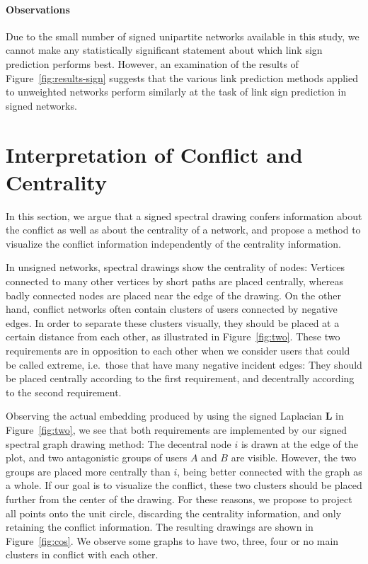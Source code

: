 \documentclass[11pt,a4paper]{book}
\begin{document}
\paragraph{Observations}
Due to the small number of signed unipartite networks available in this
study, we cannot make any statistically significant statement about
which link sign prediction performs best.  However, an examination of
the results of Figure~\ref{fig:results-sign} suggests that the various link
prediction methods applied to unweighted networks perform similarly at
the task of link sign prediction in signed networks. 

\section{Interpretation of Conflict and Centrality}
\label{sec:interpretation}
In this section, we argue that a signed spectral drawing confers
information about the conflict as well as about the centrality of a
network, and propose a method
to visualize the conflict information independently of the centrality
information. 

In unsigned networks, spectral drawings show the centrality of nodes:
Vertices connected to many other vertices by short paths are placed
centrally, whereas badly connected nodes are placed near the edge of the
drawing.    
On the other hand, conflict networks often contain clusters of
users connected by negative edges. 
In order to separate these clusters visually, they should be placed at a
certain distance from each other, as illustrated in Figure~\ref{fig:two}. 
These two requirements are in opposition to each other when we consider
users that could be called extreme, i.e.\ those that have many
negative incident edges:  They should be placed centrally according to
the first requirement, and decentrally according to the second
requirement.  

Observing the actual embedding produced by using the signed Laplacian
$\mathbf L$
in Figure~\ref{fig:two}, we see that both requirements are
implemented by our signed spectral graph drawing method:  The decentral
node $i$ is drawn at the edge of the plot, and two antagonistic
groups of users $A$ and $B$ are visible.  However, the two groups are
placed more centrally than $i$, being better connected with the graph
as a whole.  If our goal is to visualize the conflict, these two
clusters should be placed further from the center of the drawing.  For
these reasons, we propose to project all points onto the unit circle,
discarding the centrality information, and only retaining the
conflict information. 
The resulting drawings are shown in Figure~\ref{fig:cos}.  We 
observe some graphs to have two, three, four or no main clusters in
conflict with each other. 
\end{document}

